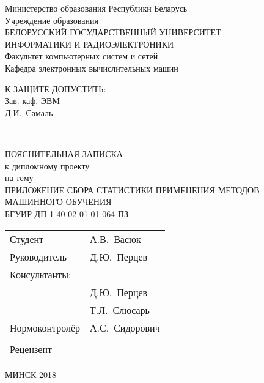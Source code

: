\begin{titlepage}
  \begin{center}
    Министерство образования Республики Беларусь\\[1em]
    Учреждение образования\\
    БЕЛОРУССКИЙ ГОСУДАРСТВЕННЫЙ УНИВЕРСИТЕТ \\
    ИНФОРМАТИКИ И РАДИОЭЛЕКТРОНИКИ\\[1em]

    Факультет компьютерных систем и сетей \\[0.6cm]

    Кафедра электронных вычислительных машин \\[1.4cm]

    \begin{flushright}
      \begin{minipage}{0.4\textwidth}
        \MakeUppercase{К защите допустить:}\\
        Зав. каф. ЭВМ\\
        \underline{\hspace*{2.8cm}} Д.И.~Самаль
      \end{minipage}\\[3.2em]
    \end{flushright}

    {ПОЯСНИТЕЛЬНАЯ ЗАПИСКА}\\
    {к дипломному проекту}\\
    {на тему}\\
    {\MakeUppercase{ПРИЛОЖЕНИЕ СБОРА СТАТИСТИКИ ПРИМЕНЕНИЯ МЕТОДОВ МАШИННОГО ОБУЧЕНИЯ}}\\[2em]


    {БГУИР ДП 1-40 02 01 01 064 ПЗ}\\[2em]

    \begin{tabular}{ p{}p{} }
      Студент & А.В.~Васюк  \\[1em]

      Руководитель & Д.Ю.~Перцев \\[1em]

      Консультанты: &\\[1em]

      \hspace*{6ex}{от кафедры ЭВМ} & Д.Ю.~Перцев \\[1em]

      \hspace*{6ex}{по экономической части} & Т.Л.~Слюсарь \\[1em]

      Нормоконтролёр & А.С.~Сидорович\\
      & \\
      Рецензент &
    \end{tabular}

    \vfill
    {\normalsize МИНСК 2018}
  \end{center}
\end{titlepage}
